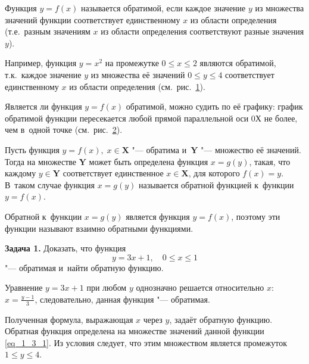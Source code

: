 \begin{Def}
Функция $y = f(x)$ называется обратимой, если каждое значение $y$
из множества значений функции соответствует единственному $x$
из области определения (т.е.\ разным значениям $x$ из области определения
соответствуют разные значения $y$).
\end{Def}

Например, функция $y = x^{2}$ на промежутке $0 \leqslant x \leqslant 2$
являются обратимой, т.к.\ каждое значение $y$ из множества её значений
$0 \leqslant y \leqslant 4$ соответствует единственному $x$ из области
определения (см.\ рис.\ \ref{fig_1_3_1}).

\begin{figure}\label{fig_1_3_1}
\end{figure}

Является ли функция $y = f(x)$ обратимой, можно судить по её графику:
график обратимой функции пересекается любой прямой параллельной оси 0Х
не более, чем в~одной точке (см.\ рис.\ \ref{fig_1_3_2}).

\begin{figure}\label{fig_1_3_2}
\end{figure}

\begin{Def}
Пусть функция $y = f(x), \; x \in \mathbf{X}$ "--- обратима
и~$\mathbf{Y}$ "--- множество её значений.
Тогда на множестве $\mathbf{Y}$ может быть определена функция $x = g(y)$,
такая, что каждому $y \in \mathbf{Y}$ соответствует единственное
$x \in \mathbf{X}$, для которого $f(x) = y$.
В~таком случае функция $x = g(y)$ называется обратной функцией
к~функции $y = f(x)$.
\end{Def}

Обратной к~функции $x = g(y)$ является функция $y = f(x)$, поэтому эти функции
называют взаимно обратными функциями.

\textbf{Задача 1.} Доказать, что функция
\begin{equation}\label{eq_1_3_1}
y = 3x + 1, \quad 0 \leqslant x \leqslant 1
\end{equation}
"--- обратимая и~найти обратную функцию.

Уравнение $y = 3x + 1$ при любом $y$ однозначно решается относительно $x$:
$\displaystyle x = \frac{y-1}{3}$, следовательно, данная функция "--- обратимая.

Полученная формула, выражающая $x$ через $y$, задаёт обратную функцию.
Обратная функция определена на множестве значений данной функции \eqref{eq_1_3_1}.
Из условия следует, что этим множеством является промежуток $1 \leqslant y \leqslant 4$.

